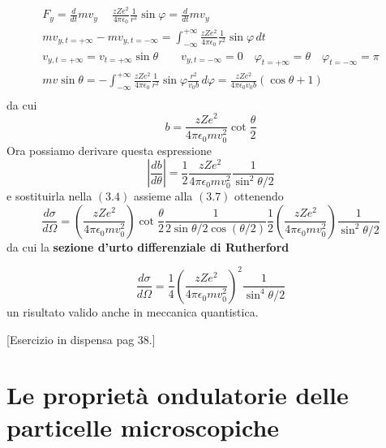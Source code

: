 \begin{gather*}
	F_y = \frac{d}{dt}m v_y \quad \ \frac{zZe^2}{4 \pi \epsilon_0}\frac{1}{r^2}\sin \varphi = \frac{d}{dt}mv_y\\
	mv_{y,t= + \infty} - mv_{y,t = - \infty} = \int_{- \infty}^{+\infty} \frac{zZe^2}{4 \pi \epsilon_0}\frac{1}{r^2}\sin \varphi\,dt\\
	v_{y,t= + \infty} = v_{t= + \infty}\sin \theta \qquad v_{y,t = - \infty} = 0 \quad \varphi_{t = +\infty} = \theta \quad \varphi_{t = - \infty} = \pi\\
	mv \sin \theta = - \int_{- \infty}^{+ \infty} \frac{zZe^2}{4 \pi \epsilon_0}\frac{1}{r^2}\sin \varphi \frac{r^2}{v_0b}\,d \varphi = \frac{zZe^2}{4 \pi \epsilon_0 v_0 b}(\cos \theta + 1)\\
\end{gather*}
da cui
\begin{equation}
	b = \frac{zZe^2}{4 \pi \epsilon_0 m v^2_0} \cot \frac{\theta}{2}
\end{equation}
Ora possiamo derivare questa espressione
\[
	\left | \frac{db}{d \theta}\right | = \frac{1}{2}\frac{zZe^2}{4 \pi \epsilon_0 m v^2_0}\frac{1}{\sin^2{\theta/2}}
\]
e sostituirla nella $(3.4)$ assieme alla $(3.7)$ ottenendo
\[
	\frac{d \sigma }{d \Omega} = \left( \frac{zZe^2}{4 \pi \epsilon_0m v^2_0}\right) \cot{\frac{\theta}{2}}\frac{1}{2 \sin{\theta / 2 \cos (\theta /2)}}\frac{1}{2}\left( \frac{zZe^2}{4 \pi \epsilon_0m v^2_0}\right)\frac{1}{\sin^2{\theta/2}}
\]
da cui la \textbf{sezione d'urto differenziale di Rutherford}

\begin{equation}
	\frac{d \sigma }{d \Omega} = \frac{1}{4} \left( \frac{zZe^2}{4 \pi \epsilon_0m v^2_0}\right) ^2\frac{1}{\sin^4{\theta / 2}}
\end{equation} un risultato valido anche in meccanica quantistica.

	[Esercizio in dispensa pag 38.]

\section{Le proprietà ondulatorie delle particelle microscopiche}\label{sec:proprieta-ondulatorie-delle-particelle-microscopiche}

